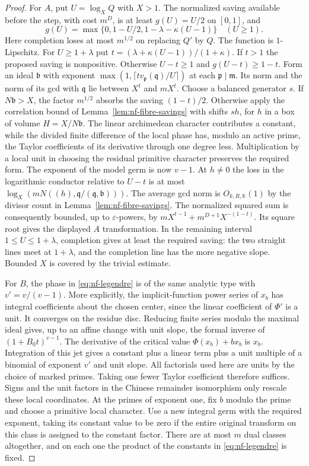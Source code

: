 \documentclass[11pt,letterpaper]{article}
\theoremstyle{definition}
\numberwithin{equation}{section}
\begin{document}
\begin{proof}
For $A$, put $U=\log_XQ$ with $X>1$. The normalized saving available
before the step, with cost $m^D$, is at least $g(U)=U/2$ on $[0,1]$,
and
\[
      g(U)=\max\{0,1-U/2,1-\lambda-\kappa(U-1)\}
                         \quad(U\ge1).
\]
Here completion loses at most $m^{1/2}$ on replacing $Q'$ by $Q$.
The function is $1$-Lipschitz. For $U\ge1+\lambda$ put
$t=(\lambda+\kappa(U-1))/(1+\kappa)$. If $t>1$ the proposed saving
is nonpositive. Otherwise $U-t\ge1$ and $g(U-t)\ge1-t$.
Form an ideal $\mathfrak b$ with exponent
$\max(1,\lceil t v_{\mathfrak p}(\mathfrak q)/U\rceil)$
at each $\mathfrak p\mid\mathfrak m$. Its norm and the norm
of its gcd with $\mathfrak q$ lie between $X^t$ and $mX^t$.
Choose a balanced generator $s$. If $N\mathfrak b>X$, the factor
$m^{1/2}$ absorbs the saving $(1-t)/2$. Otherwise apply the
correlation bound of Lemma~\ref{lem:nf-fibre-savings} with shifts
$sh$, for $h$ in a box of volume $H=X/N\mathfrak b$.
The linear archimedean character contributes a constant, while the
divided finite difference of the local phase has, modulo an active
prime, the Taylor coefficients of its derivative through one degree
less. Multiplication by a local unit in choosing the residual
primitive character preserves the required form. The exponent of
the model germ is now $v-1$. At $h\ne0$ the loss in the logarithmic
conductor relative to $U-t$ is at most
$\log_X(m N((h),\mathfrak q/(\mathfrak q,\mathfrak b)))$.
The average gcd norm is $O_{k,R,\mathbb K}(1)$ by the divisor
count in Lemma~\ref{lem:nf-fibre-savings}. The normalized squared sum
is consequently bounded, up to $\varepsilon$-powers, by
$mX^{t-1}+m^{D+1}X^{-(1-t)}$. Its square root gives the displayed
$A$ transformation. In the remaining interval $1\le U\le1+\lambda$,
completion gives at least the required saving: the two straight lines
meet at $1+\lambda$, and the completion line has the more negative
slope. Bounded $X$ is covered by the trivial estimate.

For $B$, the phase in \eqref{eq:nf-legendre} is of the same analytic
type with $v'=v/(v-1)$. More explicitly, the implicit-function power
series of $x_b$ has integral coefficients about the chosen center,
since the linear coefficient of $\Phi'$ is a unit. It converges
on the residue disc. Reducing finite series modulo the maximal ideal
gives, up to an affine change with unit slope, the formal inverse
of $(1+B_0t)^{v-1}$. The derivative of the critical value
$\Phi(x_b)+bx_b$ is $x_b$. Integration of this jet gives a constant
plus a linear term plus a unit multiple of a binomial of exponent
$v'$ and unit slope. All factorials used here are units by the
choice of marked primes. Taking one fewer Taylor coefficient
therefore suffices. Signs and the unit factors in the Chinese
remainder isomorphism only rescale these local coordinates.
At the primes of exponent one, fix $b$ modulo the prime and choose
a primitive local character. Use a new integral germ with the required
exponent, taking its constant value to be zero if the entire original
transform on this class is assigned to the constant factor. There are at most $m$ dual classes altogether, and on each
one the product of the constants in \eqref{eq:nf-legendre} is fixed.


\end{proof}
\end{document}

